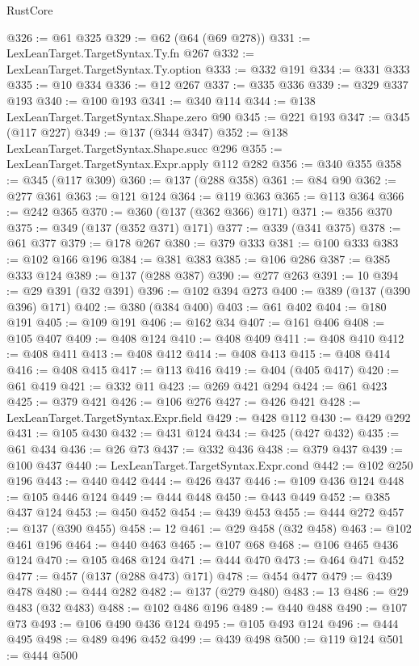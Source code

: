 \begin{lexlean}{RustCore}
\begin{coremodule}
{\begin{coremodule}
{{{{{{{{{{{{{{{{{{{{{{{{{{{{{{{{{{{{{{{{{{{{@326 := @61 @325
@329 := @62 (@64 (@69 @278))
@331 := LexLeanTarget.TargetSyntax.Ty.fn @267
@332 := LexLeanTarget.TargetSyntax.Ty.option
@333 := @332 @191
@334 := @331 @333
@335 := @10 @334
@336 := @12 @267
@337 := @335 @336
@339 := @329 @337 @193
@340 := @100 @193
@341 := @340 @114
@344 := @138 LexLeanTarget.TargetSyntax.Shape.zero @90
@345 := @221 @193
@347 := @345 (@117 @227)
@349 := @137 (@344 @347)
@352 := @138 LexLeanTarget.TargetSyntax.Shape.succ @296
@355 := LexLeanTarget.TargetSyntax.Expr.apply @112 @282
@356 := @340 @355
@358 := @345 (@117 @309)
@360 := @137 (@288 @358)
@361 := @84 @90
@362 := @277 @361
@363 := @121 @124
@364 := @119 @363
@365 := @113 @364
@366 := @242 @365
@370 := @360 (@137 (@362 @366) @171)
@371 := @356 @370
@375 := @349 (@137 (@352 @371) @171)
@377 := @339 (@341 @375)
@378 := @61 @377
@379 := @178 @267
@380 := @379 @333
@381 := @100 @333
@383 := @102 @166 @196
@384 := @381 @383
@385 := @106 @286
@387 := @385 @333 @124
@389 := @137 (@288 @387)
@390 := @277 @263
@391 := 10
@394 := @29 @391 (@32 @391)
@396 := @102 @394 @273
@400 := @389 (@137 (@390 @396) @171)
@402 := @380 (@384 @400)
@403 := @61 @402
@404 := @180 @191
@405 := @109 @191
@406 := @162 @34
@407 := @161 @406
@408 := @105 @407
@409 := @408 @124
@410 := @408 @409
@411 := @408 @410
@412 := @408 @411
@413 := @408 @412
@414 := @408 @413
@415 := @408 @414
@416 := @408 @415
@417 := @113 @416
@419 := @404 (@405 @417)
@420 := @61 @419
@421 := @332 @11
@423 := @269 @421 @294
@424 := @61 @423
@425 := @379 @421
@426 := @106 @276
@427 := @426 @421
@428 := LexLeanTarget.TargetSyntax.Expr.field
@429 := @428 @112
@430 := @429 @292
@431 := @105 @430
@432 := @431 @124
@434 := @425 (@427 @432)
@435 := @61 @434
@436 := @26 @73
@437 := @332 @436
@438 := @379 @437
@439 := @100 @437
@440 := LexLeanTarget.TargetSyntax.Expr.cond
@442 := @102 @250 @196
@443 := @440 @442
@444 := @426 @437
@446 := @109 @436 @124
@448 := @105 @446 @124
@449 := @444 @448
@450 := @443 @449
@452 := @385 @437 @124
@453 := @450 @452
@454 := @439 @453
@455 := @444 @272
@457 := @137 (@390 @455)
@458 := 12
@461 := @29 @458 (@32 @458)
@463 := @102 @461 @196
@464 := @440 @463
@465 := @107 @68
@468 := @106 @465 @436 @124
@470 := @105 @468 @124
@471 := @444 @470
@473 := @464 @471 @452
@477 := @457 (@137 (@288 @473) @171)
@478 := @454 @477
@479 := @439 @478
@480 := @444 @282
@482 := @137 (@279 @480)
@483 := 13
@486 := @29 @483 (@32 @483)
@488 := @102 @486 @196
@489 := @440 @488
@490 := @107 @73
@493 := @106 @490 @436 @124
@495 := @105 @493 @124
@496 := @444 @495
@498 := @489 @496 @452
@499 := @439 @498
@500 := @119 @124
@501 := @444 @500
}}}}}}}}}}}}}}}}}}}}}}}}}}}}}}}}}}}}}}}}}}}}
\end{coremodule}}
\end{coremodule}
\end{lexlean}
